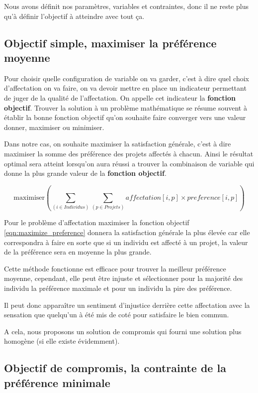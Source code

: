 \documentclass[final,poster]{polytech/polytech}
\begin{document}
Nous avons définit nos paramètres, variables et contraintes, donc il ne reste plus qu'à définir l'objectif à atteindre avec tout ça.
\subsection{Objectif simple, maximiser la préférence moyenne}
\label{sec:max_pref_moy}

Pour choisir quelle configuration de variable on va garder, c'est à dire quel choix d'affectation on va faire, on va devoir mettre en place un indicateur permettant de juger de la qualité de l'affectation.
On appelle cet indicateur la \textbf{fonction objectif}.
Trouver la solution à un problème mathématique se résume souvent à établir la bonne fonction objectif qu'on souhaite faire converger vers une valeur donner, maximiser ou minimiser.


Dans notre cas, on souhaite maximiser la satisfaction générale, c'est à dire maximiser la somme des préférence des projets affectés à chacun. Ainsi le résultat optimal sera atteint lorsqu'on aura réussi a trouver la combinaison de variable qui donne la plus grande valeur de la \textbf{fonction objectif}.

\begin{equation}
\label{eqn:maximize_preference}
\text{maximiser} \left( \sum_{(i \in Individus)} \sum_{(p\in Projets)} affectation[i,p]\times preference[i,p] \right)
\end{equation}

Pour le problème d'affectation maximiser la fonction objectif \eqref{eqn:maximize_preference} donnera la satisfaction générale la plus élevée car elle correspondra à faire en sorte que si un individu est affecté à un projet, la valeur de la préférence sera en moyenne la plus grande.

Cette méthode fonctionne est efficace pour trouver la meilleur préférence moyenne, cependant, elle peut être injuste et sélectionner pour la majorité des individu la préférence maximale et pour un individu la pire des préférence.

Il peut donc apparaître un sentiment d'injustice derrière cette affectation avec la sensation que quelqu'un à été mis de coté pour satisfaire le bien commun.

A cela, nous proposons un solution de compromis qui fourni une solution plus homogène (si elle existe évidemment).

\subsection{Objectif de compromis, la contrainte de la préférence minimale}
\label{sec:pref_min}
\end{document}
